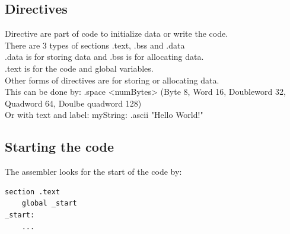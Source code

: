 \documentclass[12pt, a4paper]{article}
\begin{document}
		\subsection{Directives}
			Directive are part of code to initialize data or write the code.\\
			There are 3 types of sections .text, .bss and .data\\
			.data is for storing data and .bss is for allocating data.\\
			.text is for the code and global variables.\\
			Other forms of directives are for storing or allocating data.\\
			This can be done by: .space <numBytes> (Byte 8, Word 16, Doubleword 32, Quadword 64, Doulbe quadword 128)\\
			Or with text and label: myString: .ascii "Hello World!"
		\subsection{Starting the code}
			The assembler looks for the start of the code by:\\
			\begin{lstlisting}[language={[x86masm]Assembler}]
section .text
	global _start
_start:
	...\end{lstlisting}
\end{document}
